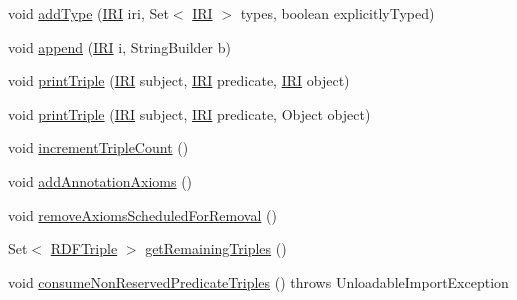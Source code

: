 \begin{DoxyCompactItemize}
\item 
void \hyperlink{classorg_1_1coode_1_1owlapi_1_1rdfxml_1_1parser_1_1_o_w_l_r_d_f_consumer_a59d5b9d4e1a4c2c60f22864c068aa7ac}{add\-Type} (\hyperlink{classorg_1_1semanticweb_1_1owlapi_1_1model_1_1_i_r_i}{I\-R\-I} iri, Set$<$ \hyperlink{classorg_1_1semanticweb_1_1owlapi_1_1model_1_1_i_r_i}{I\-R\-I} $>$ types, boolean explicitly\-Typed)
\item 
void \hyperlink{classorg_1_1coode_1_1owlapi_1_1rdfxml_1_1parser_1_1_o_w_l_r_d_f_consumer_a9d3a127050ff4d3ed707ab839c0f9038}{append} (\hyperlink{classorg_1_1semanticweb_1_1owlapi_1_1model_1_1_i_r_i}{I\-R\-I} i, String\-Builder b)
\item 
void \hyperlink{classorg_1_1coode_1_1owlapi_1_1rdfxml_1_1parser_1_1_o_w_l_r_d_f_consumer_a883944b189ea48844e843ec0fc8641b0}{print\-Triple} (\hyperlink{classorg_1_1semanticweb_1_1owlapi_1_1model_1_1_i_r_i}{I\-R\-I} subject, \hyperlink{classorg_1_1semanticweb_1_1owlapi_1_1model_1_1_i_r_i}{I\-R\-I} predicate, \hyperlink{classorg_1_1semanticweb_1_1owlapi_1_1model_1_1_i_r_i}{I\-R\-I} object)
\item 
void \hyperlink{classorg_1_1coode_1_1owlapi_1_1rdfxml_1_1parser_1_1_o_w_l_r_d_f_consumer_ac2fddb811653ffc90a6a9e4c1b32f16a}{print\-Triple} (\hyperlink{classorg_1_1semanticweb_1_1owlapi_1_1model_1_1_i_r_i}{I\-R\-I} subject, \hyperlink{classorg_1_1semanticweb_1_1owlapi_1_1model_1_1_i_r_i}{I\-R\-I} predicate, Object object)
\item 
void \hyperlink{classorg_1_1coode_1_1owlapi_1_1rdfxml_1_1parser_1_1_o_w_l_r_d_f_consumer_a6d046c77dad1e747ab4b14d3c317dd7d}{increment\-Triple\-Count} ()
\item 
void \hyperlink{classorg_1_1coode_1_1owlapi_1_1rdfxml_1_1parser_1_1_o_w_l_r_d_f_consumer_ad649025da4661f7e9634ce129dc18c1b}{add\-Annotation\-Axioms} ()
\item 
void \hyperlink{classorg_1_1coode_1_1owlapi_1_1rdfxml_1_1parser_1_1_o_w_l_r_d_f_consumer_ad335a9ebd78d4c8a90e82a904eae7bc0}{remove\-Axioms\-Scheduled\-For\-Removal} ()
\item 
Set$<$ \hyperlink{classorg_1_1semanticweb_1_1owlapi_1_1io_1_1_r_d_f_triple}{R\-D\-F\-Triple} $>$ \hyperlink{classorg_1_1coode_1_1owlapi_1_1rdfxml_1_1parser_1_1_o_w_l_r_d_f_consumer_a4a0c6340535c95514ee45b7e1c8b5ff2}{get\-Remaining\-Triples} ()
\item 
void \hyperlink{classorg_1_1coode_1_1owlapi_1_1rdfxml_1_1parser_1_1_o_w_l_r_d_f_consumer_a2d2c666f2237ab37fbe8d9231d631fc1}{consume\-Non\-Reserved\-Predicate\-Triples} ()  throws Unloadable\-Import\-Exception 

\end{DoxyCompactItemize}
